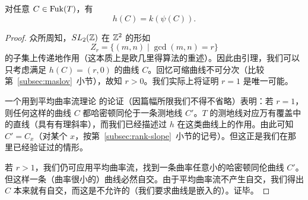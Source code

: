 
\begin{theorem}\label{thm:7.3}
对任意 $C\in\operatorname{Fuk}(T)$，有
\[
h(C)=k(\psi(C)).
\]
\end{theorem}

\begin{proof}
众所周知，$SL_2(\mathbb{Z})$ 在 $\mathbb{Z}^2$ 的形如
\[
Z_r=\{(m,n)\mid \gcd(m,n)=r\}
\]
的子集上传递地作用（这本质上是欧几里得算法的重述）。因此由引理，我们可以只考虑满足 $h(C)=(r,0)$ 的曲线 $C$。回忆可缩曲线不可分次（比较第~\ref{subsec:maslov}~小节），故知 $r>0$。我们实际上将证明 $r=1$ 是唯一可能。

一个用到平均曲率流理论 \cite{ref6} 的论证（因篇幅所限我们不得不省略）表明：若 $r=1$，则任何这样的曲线 $C$ 都哈密顿同伦于一条测地线 $C'$。$T$ 的测地线对应万有覆盖中的直线（具有有理斜率），而我们已经描述过 $h$ 在这类曲线上的作用。由此可知 $C'=C_x$（对某个 $x$，按第~\ref{subsec:rank-slope}~小节的记号）。但这正是我们在那里已经验证过的情形。


若 $r>1$，我们仍可应用平均曲率流，找到一条曲率任意小的哈密顿同伦曲线 $C'$。但这样一条（曲率很小的）曲线必然自交。由于平均曲率流不产生自交，我们得出 $C$ 本来就有自交，而这是不允许的（我们要求曲线是嵌入的）。证毕。
\end{proof}


